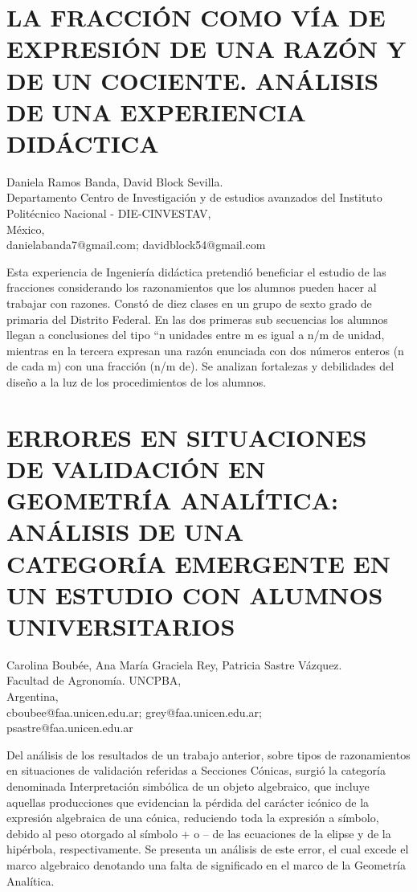 \section{LA FRACCIÓN COMO VÍA DE EXPRESIÓN DE UNA RAZÓN Y DE UN COCIENTE.
ANÁLISIS DE UNA EXPERIENCIA DIDÁCTICA}

\begin{datos}
Daniela Ramos Banda, David Block Sevilla. \\
Departamento Centro de Investigación y de estudios avanzados del Instituto Politécnico Nacional - DIE-CINVESTAV,\\
\hfill México, \\
\hfill danielabanda7@gmail.com; davidblock54@gmail.com
\end{datos}

Esta experiencia de Ingeniería didáctica pretendió beneficiar el estudio
de las fracciones considerando los razonamientos que los alumnos pueden
hacer al trabajar con razones. Constó de diez clases en un grupo de
sexto grado de primaria del Distrito Federal. En las dos primeras
sub secuencias los alumnos llegan a conclusiones del tipo “n unidades
entre m es igual a n/m de unidad, mientras en la tercera expresan
una razón enunciada con dos números enteros (n de cada m) con una
fracción (n/m de). Se analizan fortalezas y debilidades del diseño
a la luz de los procedimientos de los alumnos. 


\section{ERRORES EN SITUACIONES DE VALIDACIÓN EN GEOMETRÍA ANALÍTICA: ANÁLISIS
DE UNA CATEGORÍA EMERGENTE EN UN ESTUDIO CON ALUMNOS UNIVERSITARIOS}

\begin{datos}
Carolina Boubée, Ana María Graciela Rey, Patricia Sastre Vázquez. \\
Facultad de Agronomía. UNCPBA,\\
\hfill Argentina, \\
\hfill cboubee@faa.unicen.edu.ar; grey@faa.unicen.edu.ar; \\ \hfill psastre@faa.unicen.edu.ar
\end{datos}

Del análisis de los resultados de un trabajo anterior, sobre tipos
de razonamientos en situaciones de validación referidas a Secciones
Cónicas, surgió la categoría denominada Interpretación simbólica de
un objeto algebraico, que incluye aquellas producciones que evidencian
la pérdida del carácter icónico de la expresión algebraica de una
cónica, reduciendo toda la expresión a símbolo, debido al peso otorgado
al símbolo + o – de las ecuaciones de la elipse y de la hipérbola,
respectivamente. Se presenta un análisis de este error, el cual excede
el marco algebraico denotando una falta de significado en el marco
de la Geometría Analítica. 


